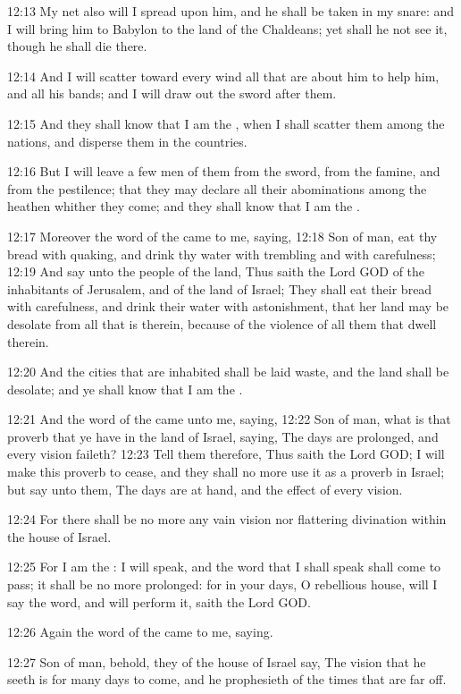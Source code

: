 12:13 My net also will I spread upon him, and he shall be taken in my
snare: and I will bring him to Babylon to the land of the Chaldeans;
yet shall he not see it, though he shall die there.

12:14 And I will scatter toward every wind all that are about him to
help him, and all his bands; and I will draw out the sword after them.

12:15 And they shall know that I am the \LORD, when I shall scatter
them among the nations, and disperse them in the countries.

12:16 But I will leave a few men of them from the sword, from the
famine, and from the pestilence; that they may declare all their
abominations among the heathen whither they come; and they shall know
that I am the \LORD.

12:17 Moreover the word of the \LORD came to me, saying, 12:18 Son of
man, eat thy bread with quaking, and drink thy water with trembling
and with carefulness; 12:19 And say unto the people of the land, Thus
saith the Lord GOD of the inhabitants of Jerusalem, and of the land of
Israel; They shall eat their bread with carefulness, and drink their
water with astonishment, that her land may be desolate from all that
is therein, because of the violence of all them that dwell therein.

12:20 And the cities that are inhabited shall be laid waste, and the
land shall be desolate; and ye shall know that I am the \LORD.

12:21 And the word of the \LORD came unto me, saying, 12:22 Son of man,
what is that proverb that ye have in the land of Israel, saying, The
days are prolonged, and every vision faileth?  12:23 Tell them
therefore, Thus saith the Lord GOD; I will make this proverb to cease,
and they shall no more use it as a proverb in Israel; but say unto
them, The days are at hand, and the effect of every vision.

12:24 For there shall be no more any vain vision nor flattering
divination within the house of Israel.

12:25 For I am the \LORD: I will speak, and the word that I shall speak
shall come to pass; it shall be no more prolonged: for in your days, O
rebellious house, will I say the word, and will perform it, saith the
Lord GOD.

12:26 Again the word of the \LORD came to me, saying.

12:27 Son of man, behold, they of the house of Israel say, The vision
that he seeth is for many days to come, and he prophesieth of the
times that are far off.

